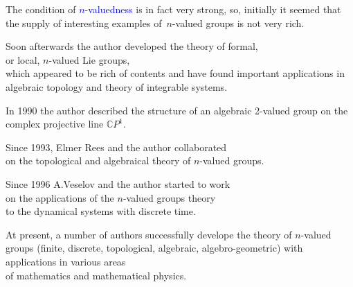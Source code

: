 \documentclass{beamer}
\def\blue#1{\textcolor{blue}{#1}}
\begin{document}
\begin{frame}{}
The condition of \blue{$n$-valuedness} is in fact very strong, so,
initially it seemed that the supply of interesting examples
of~$n$-valued groups is not very rich.
\vspace{0.5cm}

Soon afterwards the author developed the theory of formal,\\
or local, $n$-valued Lie groups,\\
which appeared to be rich of contents and have found important applications
in algebraic topology and theory of integrable systems.
\end{frame}




\begin{frame}{}
In 1990 the author described the structure of an algebraic 2-valued group
on the complex projective line $\mathbb{C}P^1$.
\vspace{0.5cm}

Since 1993, Elmer Rees and the author collaborated\\
on the topological and algebraical theory of $n$-valued groups.
\vspace{0.5cm}

Since 1996 A.Veselov and the author started to work\\
on the applications of the $n$-valued groups theory\\
to the dynamical systems with discrete time.
\vspace{0.5cm}

At present, a number of authors successfully develope the theory
of $n$-valued groups (finite, discrete, topological, algebraic,
algebro-geometric) with applications in various areas\\
of mathematics and mathematical physics.
\end{frame}
\end{document}
